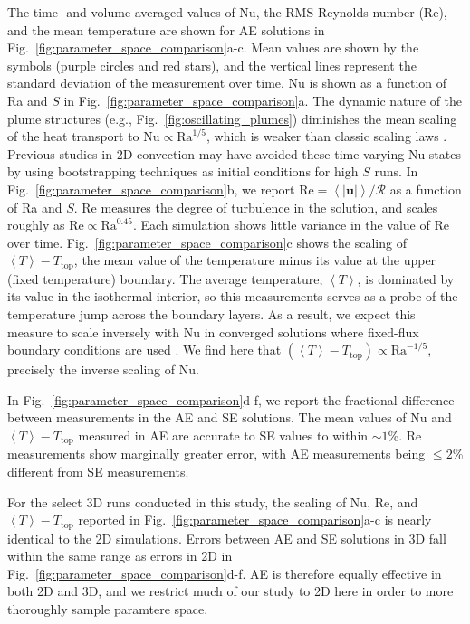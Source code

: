 \documentclass[aps, pre, onecolumn, nofootinbib, notitlepage, groupedaddress, amsfonts, amssymb, amsmath, longbibliography]{revtex4-1}
\newcommand{\angles}[1]{\ensuremath{\left\langle #1 \right\rangle}}
\begin{document}
The time- and volume-averaged values of Nu, the RMS
Reynolds number (Re), and the mean temperature 
are shown for AE solutions in Fig.~\ref{fig:parameter_space_comparison}a-c.
Mean values are shown by the symbols (purple circles and red stars), and 
the vertical lines represent the standard deviation of the measurement over time.
Nu is shown as a function of Ra and $S$ in Fig.~\ref{fig:parameter_space_comparison}a.
The dynamic nature of the plume structures (e.g., Fig.~\ref{fig:oscillating_plumes})
diminishes the mean
scaling of the heat transport to $\text{Nu} \propto \text{Ra}^{1/5}$,
which is weaker than classic scaling laws \cite{johnston&doering2009, ahlers&all2009}.
Previous studies in 2D convection may have avoided these time-varying Nu states by using
bootstrapping techniques as initial conditions for high $S$ runs.
In Fig.~\ref{fig:parameter_space_comparison}b, we report 
$\text{Re} = \angles{|\bm{u}|} / \mathcal{R}$ as a function of Ra and $S$.  
Re measures the degree of
turbulence in the solution, and scales roughly as
$\text{Re} \propto \text{Ra}^{0.45}$. Each simulation shows little variance in
the value of Re over time.
Fig.~\ref{fig:parameter_space_comparison}c shows the scaling of $\angles{T} - T_{\text{top}}$,
the mean value of the temperature minus its value at the upper (fixed temperature) boundary.
The average temperature, $\angles{T}$, is dominated by its value in the isothermal interior,
so this measurements serves as a probe of the temperature jump across the boundary
layers. As a result, we expect this measure to
scale inversely with Nu in converged solutions
where fixed-flux boundary conditions are used \cite{otero&all2002}.  We find here
that $(\angles{T} - T_{\text{top}}) \propto \text{Ra}^{-1/5}$, precisely the inverse
scaling of Nu.



In Fig.~\ref{fig:parameter_space_comparison}d-f, we report the fractional difference
between measurements in the AE and SE solutions.
The mean values of Nu and $\angles{T} - T_{\text{top}}$ 
measured in AE are accurate to SE values to within $\sim 1$\%.
Re measurements show marginally greater error, with AE measurements being 
$\leq 2$\% different from SE measurements.

For the select 3D runs conducted in this study, the scaling of Nu, Re, and $\angles{T} - T_{\text{top}}$
reported in Fig.~\ref{fig:parameter_space_comparison}a-c is nearly identical to the
2D simulations. Errors between AE and SE solutions in 3D fall within the same range as
errors in 2D in Fig.~\ref{fig:parameter_space_comparison}d-f. AE is therefore
equally effective in both 2D and 3D, and we restrict much of our study to 2D here
in order to more thoroughly sample paramtere space.
\end{document}
